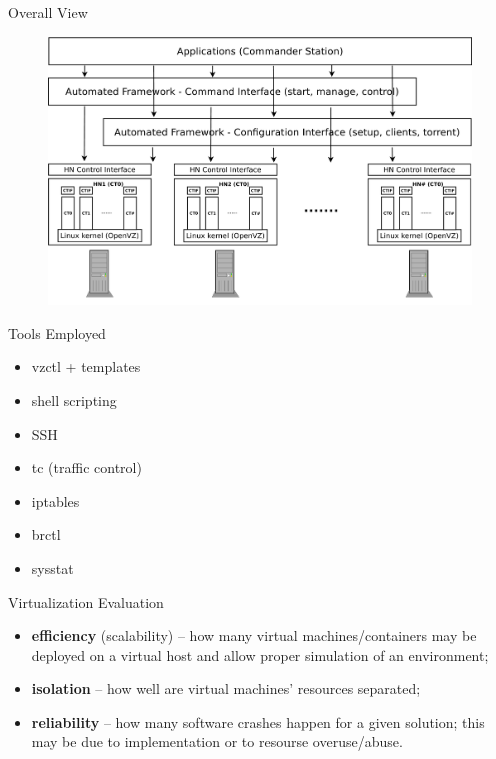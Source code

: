 \documentclass{beamer}
\begin{document}
\begin{frame}{Overall View}
  \begin{figure}
    \includegraphics[scale=0.17]{img/virt-infra-overview}
  \end{figure}
\end{frame}

\begin{frame}{Tools Employed}
  \begin{itemize}
    \item vzctl + templates
    \item shell scripting
    \item SSH
    \item tc (traffic control)
    \item iptables
    \item brctl
    \item sysstat
  \end{itemize}
\end{frame}

\begin{frame}{Virtualization Evaluation}
  \begin{itemize}
    \item \textbf{efficiency} (scalability) -- how many virtual
    machines/containers may be deployed on a virtual host and allow proper
    simulation of an environment;
    \item \textbf{isolation} -- how well are virtual machines' resources
    separated;
    \item \textbf{reliability} -- how many software crashes happen for a given
    solution; this may be due to implementation or to resourse overuse/abuse.
  \end{itemize}
\end{frame}
\end{document}

